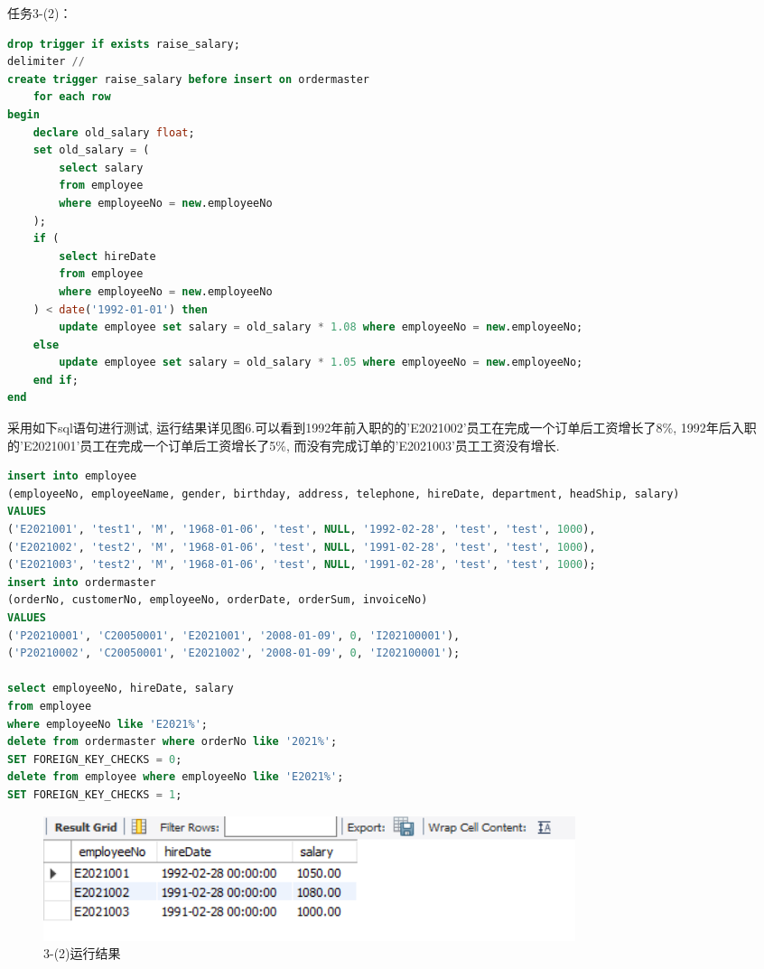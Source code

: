 \documentclass[a4paper,UTF8]{article}
\theoremstyle{definition}
\begin{document}
\begin{CJK}{UTF8}{gkai}
{\heiti \large 任务3-(2)：}
\begin{lstlisting}[language=SQL]
drop trigger if exists raise_salary;
delimiter //
create trigger raise_salary before insert on ordermaster
	for each row
begin
	declare old_salary float;
    set old_salary = (
		select salary
        from employee
        where employeeNo = new.employeeNo
    );
	if (
		select hireDate
        from employee
        where employeeNo = new.employeeNo
    ) < date('1992-01-01') then
		update employee set salary = old_salary * 1.08 where employeeNo = new.employeeNo;
	else 
		update employee set salary = old_salary * 1.05 where employeeNo = new.employeeNo;
	end if;
end
\end{lstlisting}
\par 采用如下sql语句进行测试, 运行结果详见图6.可以看到1992年前入职的的'E2021002'员工在完成一个订单后工资增长了8\%, 1992年后入职的'E2021001'员工在完成一个订单后工资增长了5\%, 而没有完成订单的'E2021003'员工工资没有增长.
\begin{lstlisting}[language=SQL]
insert into employee
(employeeNo, employeeName, gender, birthday, address, telephone, hireDate, department, headShip, salary)
VALUES
('E2021001', 'test1', 'M', '1968-01-06', 'test', NULL, '1992-02-28', 'test', 'test', 1000),
('E2021002', 'test2', 'M', '1968-01-06', 'test', NULL, '1991-02-28', 'test', 'test', 1000),
('E2021003', 'test2', 'M', '1968-01-06', 'test', NULL, '1991-02-28', 'test', 'test', 1000);
insert into ordermaster
(orderNo, customerNo, employeeNo, orderDate, orderSum, invoiceNo)
VALUES
('P20210001', 'C20050001', 'E2021001', '2008-01-09', 0, 'I202100001'),
('P20210002', 'C20050001', 'E2021002', '2008-01-09', 0, 'I202100001');

select employeeNo, hireDate, salary
from employee
where employeeNo like 'E2021%';
delete from ordermaster where orderNo like '2021%';
SET FOREIGN_KEY_CHECKS = 0;
delete from employee where employeeNo like 'E2021%';
SET FOREIGN_KEY_CHECKS = 1;
\end{lstlisting}
\begin{figure}[h]
\centering
\includegraphics[scale=0.6]{./img/3-2.png}
\caption{3-(2)运行结果}
\label{fig:label}
\end{figure}



\end{CJK}
\end{document}
